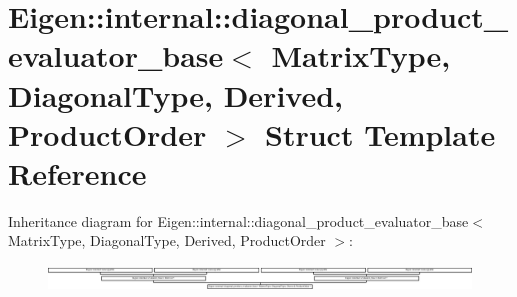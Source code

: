 \hypertarget{struct_eigen_1_1internal_1_1diagonal__product__evaluator__base}{}\section{Eigen\+:\+:internal\+:\+:diagonal\+\_\+product\+\_\+evaluator\+\_\+base$<$ Matrix\+Type, Diagonal\+Type, Derived, Product\+Order $>$ Struct Template Reference}
\label{struct_eigen_1_1internal_1_1diagonal__product__evaluator__base}
Inheritance diagram for Eigen\+:\+:internal\+:\+:diagonal\+\_\+product\+\_\+evaluator\+\_\+base$<$ Matrix\+Type, Diagonal\+Type, Derived, Product\+Order $>$\+:\begin{figure}[H]
\begin{center}
\leavevmode
\includegraphics[height=0.685155cm]{struct_eigen_1_1internal_1_1diagonal__product__evaluator__base}
\end{center}
\end{figure}
